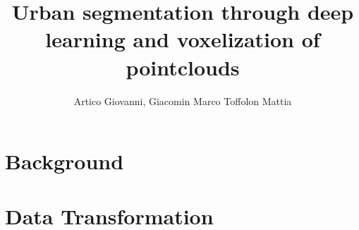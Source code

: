 \documentclass[letterpaper]{article} %
\title{Urban segmentation through deep learning and voxelization of pointclouds}
\author{
    Artico Giovanni\equalcontrib,
    Giacomin Marco\equalcontrib
    Toffolon Mattia\equalcontrib
}
\begin{document}
\maketitle

\section{Background}

\section{Data Transformation}


%
%
%
%
%
%
%
%
%
%
%
%
%
\nocite{*}
\newpage

\end{document}
